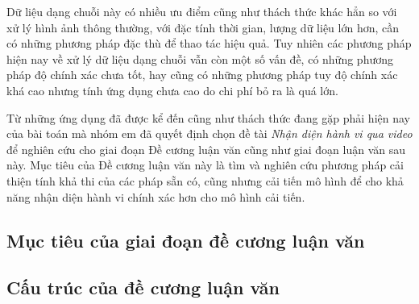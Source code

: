 Dữ liệu dạng chuỗi này có nhiều ưu điểm cũng như thách thức khác hẳn so với xử lý hình ảnh thông thường, với đặc tính thời gian, lượng dữ liệu lớn hơn,
cần có những phương pháp đặc thù để thao tác hiệu quả. Tuy nhiên các phương pháp hiện nay về xử lý dữ liệu dạng chuỗi vẫn còn một số vấn đề,
có những phương pháp độ chính xác chưa tốt, hay cũng có những phương pháp tuy độ chính xác khá cao nhưng tính ứng dụng chưa cao do chi phí bỏ ra là quá lớn.

Từ những ứng dụng đã được kể  đến cũng như thách thức đang gặp phải hiện nay của bài toán mà nhóm em đã quyết định chọn đề tài
\textit{Nhận diện hành vi qua video} để nghiên cứu cho giai đoạn Đề cương luận văn cũng như giai đoạn luận văn sau này.
Mục tiêu của Đề cương luận văn này là tìm và nghiên cứu phương pháp cải thiện tính khả thi của các pháp sẵn có, cũng nhưng cải tiến mô hình để cho khả năng
nhận diện hành vi chính xác hơn cho mô hình cải tiến.




\subsection{Mục tiêu của giai đoạn đề cương luận văn}


\subsection{Cấu trúc của đề cương luận văn}

